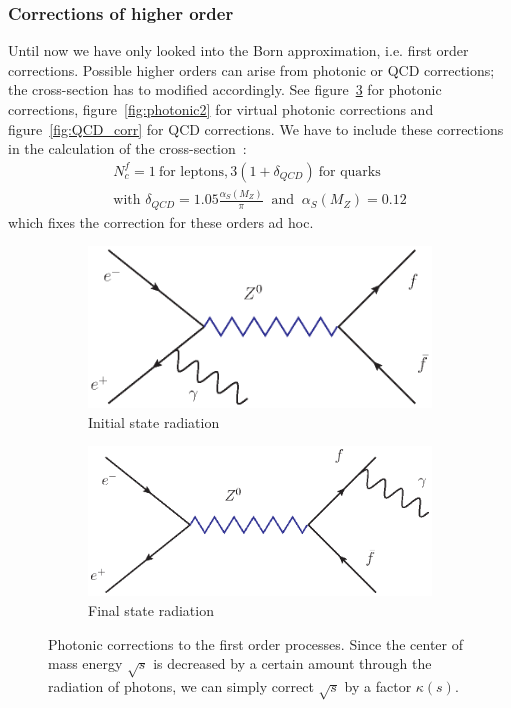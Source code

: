 \subsubsection{Corrections of higher order}
\label{ssub:Corrections_of_higher_order}
Until now we have only looked into the Born approximation, i.e. first order corrections. Possible higher orders can arise
from photonic or QCD corrections; the cross-section has to modified accordingly. See figure~\ref{fig:photonic} for
photonic corrections, figure~\ref{fig:photonic2} for virtual photonic corrections and figure~\ref{fig:QCD_corr} for QCD
corrections. We have to include these corrections in the calculation of the cross-section~\cite{ver}:
    \begin{align*}
        \label{eq:qcd_corr}
        N_c^f = 1 \: \text{for leptons}, 3(1 + \delta_{QCD}) \: \text{for quarks}\\
        \text{with } \delta_{QCD} = 1.05 \frac{\alpha_S(M_Z)}{\pi} \: \text{ and } \: \alpha_S(M_Z) = 0.12 
    \end{align*}
which fixes the correction for these orders ad hoc.
\begin{figure}[htpb]
\centering
\begin{subfigure}{.5\textwidth}
  \centering
  \includegraphics[width=1.0\linewidth]{figures/corr1}
  \caption{Initial state radiation}
  \label{fig:sub1}
\end{subfigure}%
\begin{subfigure}{.5\textwidth}
  \centering
  \includegraphics[width=1.0\linewidth]{figures/corr2}
  \caption{Final state radiation}
  \label{fig:sub2}
\end{subfigure}
\caption{Photonic corrections to the first order processes. Since the center of mass energy $\sqrt{s}$ is decreased 
by a certain amount through the radiation of photons, we can simply correct $\sqrt{s}$ by a factor $\kappa(s)$. }
\label{fig:photonic}
\end{figure}

